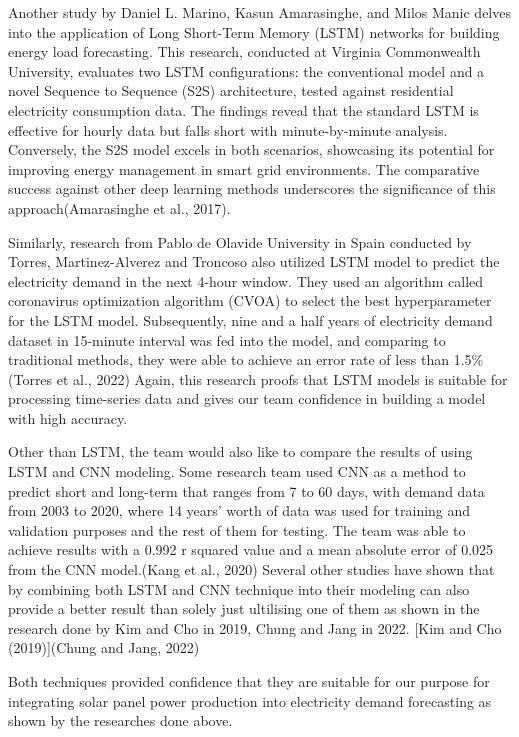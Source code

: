 \documentclass[mstat,12pt]{unswthesis}
\begin{document}
Another study by Daniel L. Marino, Kasun Amarasinghe, and Milos Manic
delves into the application of Long Short-Term Memory (LSTM) networks
for building energy load forecasting. This research, conducted at
Virginia Commonwealth University, evaluates two LSTM configurations: the
conventional model and a novel Sequence to Sequence (S2S) architecture,
tested against residential electricity consumption data. The findings
reveal that the standard LSTM is effective for hourly data but falls
short with minute-by-minute analysis. Conversely, the S2S model excels
in both scenarios, showcasing its potential for improving energy
management in smart grid environments. The comparative success against
other deep learning methods underscores the significance of this
approach(Amarasinghe et al., 2017).

Similarly, research from Pablo de Olavide University in Spain conducted
by Torres, Martinez-Alverez and Troncoso also utilized LSTM model to
predict the electricity demand in the next 4-hour window. They used an
algorithm called coronavirus optimization algorithm (CVOA) to select the
best hyperparameter for the LSTM model. Subsequently, nine and a half
years of electricity demand dataset in 15-minute interval was fed into
the model, and comparing to traditional methods, they were able to
achieve an error rate of less than 1.5\% (Torres et al., 2022) Again,
this research proofs that LSTM models is suitable for processing
time-series data and gives our team confidence in building a model with
high accuracy.

Other than LSTM, the team would also like to compare the results of
using LSTM and CNN modeling. Some research team used CNN as a method to
predict short and long-term that ranges from 7 to 60 days, with demand
data from 2003 to 2020, where 14 years' worth of data was used for
training and validation purposes and the rest of them for testing. The
team was able to achieve results with a 0.992 r squared value and a mean
absolute error of 0.025 from the CNN model.(Kang et al., 2020) Several
other studies have shown that by combining both LSTM and CNN technique
into their modeling can also provide a better result than solely just
ultilising one of them as shown in the research done by Kim and Cho in
2019, Chung and Jang in 2022. {[}Kim and Cho (2019){]}(Chung and Jang,
2022)

Both techniques provided confidence that they are suitable for our
purpose for integrating solar panel power production into electricity
demand forecasting as shown by the researches done above.
\end{document}
